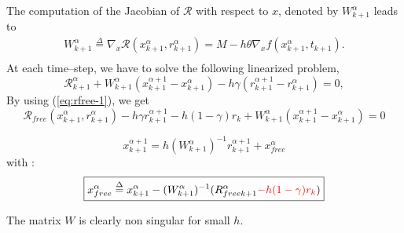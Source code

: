 The computation of the Jacobian of $\mathcal R$ with respect to $x$, denoted by $   W^{\alpha}_{k+1}$ leads to 
\begin{equation}
   \label{eq:NL9}
   \begin{array}{l}
    W^{\alpha}_{k+1} \stackrel{\Delta}{=} \nabla_{x} \mathcal R (x^{\alpha}_{k+1},r^{\alpha}_{k+1})= M - h  \theta \nabla_{x} f(  x^{\alpha}_{k+1}, t_{k+1} ).\\
 \end{array}
\end{equation}
At each time--step, we have to solve the following linearized problem,
\begin{equation}
   \label{eq:NL10}
    \mathcal R^{\alpha}_{k+1} + W^{\alpha}_{k+1} (x^{\alpha+1}_{k+1} -
    x^{\alpha}_{k+1}) - h \gamma (r^{\alpha+1}_{k+1} - r^{\alpha}_{k+1} )  =0 ,
\end{equation}
By using (\ref{eq:rfree-1}), we get
\begin{equation}
  \label{eq:rfree-2}
  \mathcal R
_{free}(x^{\alpha}_{k+1},r^{\alpha}_{k+1} )  - h\gamma r^{\alpha+1}_{k+1} - h(1-\gamma)r_k  + W^{\alpha}_{k+1} (x^{\alpha+1}_{k+1} -
    x^{\alpha}_{k+1})  =0 
\end{equation}

{
  \begin{equation}
    \boxed{ x^{\alpha+1}_{k+1} = h(W^{\alpha}_{k+1})^{-1}r^{\alpha+1}_{k+1} +x^\alpha_{free}}
  \end{equation}
}
with :
\begin{equation}
  \boxed{x^\alpha_{free}\stackrel{\Delta}{=}x^{\alpha}_{k+1}-(W^{\alpha}_{k+1})^{-1}\mathcal (R_{freek+1}^{\alpha} \textcolor{red}{- h(1-\gamma) r_k})\label{eq:rfree-12}}
\end{equation}

The matrix $W$ is clearly non singular for small $h$.





